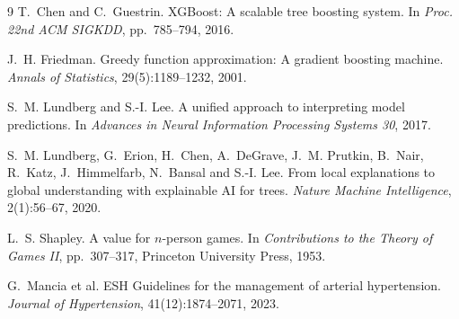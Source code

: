 \documentclass[11pt,a4paper]{article}
\begin{document}
\begin{thebibliography}{9}
\small
{}
T.~Chen and C.~Guestrin.
\newblock XGBoost: A scalable tree boosting system.
\newblock In \emph{Proc. 22nd ACM SIGKDD}, pp.~785--794, 2016.

J.~H. Friedman.
\newblock Greedy function approximation: A gradient boosting machine.
\newblock \emph{Annals of Statistics}, 29(5):1189--1232, 2001.

S.~M. Lundberg and S.-I. Lee.
\newblock A unified approach to interpreting model predictions.
\newblock In \emph{Advances in Neural Information Processing Systems 30}, 2017.

S.~M. Lundberg, G.~Erion, H.~Chen, A.~DeGrave, J.~M. Prutkin, B.~Nair, R.~Katz,
J.~Himmelfarb, N.~Bansal and S.-I. Lee.
\newblock From local explanations to global understanding with explainable AI for
trees.
\newblock \emph{Nature Machine Intelligence}, 2(1):56--67, 2020.

L.~S. Shapley.
\newblock A value for $n$-person games.
\newblock In \emph{Contributions to the Theory of Games II}, pp.~307--317,
Princeton University Press, 1953.

G.~Mancia et al.
 ESH Guidelines for the management of arterial hypertension.
\newblock \emph{Journal of Hypertension}, 41(12):1874--2071, 2023.
\end{thebibliography}
\end{document}

